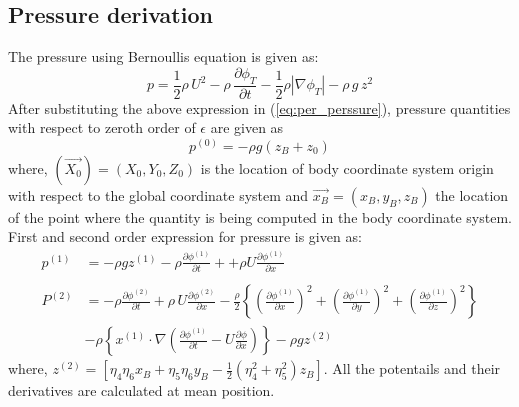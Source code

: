\subsection{Pressure derivation}
The pressure using Bernoullis equation is given as:
\begin{equation}
    \label{eq:pressure}
    p = \frac{1}{2}\rho\,U^2 - \rho\,\frac{\partial \phi_T}{\partial t} - \frac{1}{2}\rho |\nabla\phi_T|-\rho\,g\,z^2
\end{equation} 
After substituting the above expression in (\ref{eq:per_perssure}), pressure quantities with respect 
to zeroth order of $\epsilon$ are given as 
\begin{equation}
    \label{eq:pressure_zero}
    p^{(0)} = - \rho g(z_B + z_0)
\end{equation}
where, $(\vec{X_0}) = (X_0, Y_0, Z_0)$ is the location of body coordinate system origin with respect to the global 
coordinate system and $\vec{x_B}=(x_B, y_B, z_B)$ the location of the point where the quantity is being computed in the body coordinate
system.
First and second order expression for pressure is given as:
\begin{align}
    \label{eq:pressure_first}
    p^{(1)} &= -\rho g z^{(1)} - \rho\frac{\partial \phi^{(1)}}{\partial t} +
    +\rho U\frac{\partial \phi^{(1)}}{\partial x}
    \\ \nonumber \\
    \label{eq:pressure_second}
    P^{(2)} &= -\rho\frac{\partial \phi^{(2)}}{\partial t} + \rho\,U\frac{\partial \phi^{(2)}}{\partial x} -\frac{\rho}{2}
    \left\{\left(\frac{\partial \phi^{(1)}}{\partial x}\right)^2 + \left(\frac{\partial \phi^{(1)}}{\partial y}\right)^2 + 
    \left(\frac{\partial \phi^{(1)}}{\partial z}\right)^2\right\} \\ \nonumber
    &-\rho\left\{x^{(1)}\cdot\nabla \left(\frac{\partial \phi^{(1)}}{\partial t} - U\frac{\partial \phi}{\partial x}\right)\right\}
    - \rho g z^{(2)}
\end{align}
where, $z^{(2)} = [\eta_4\eta_6 x_B + \eta_5\eta_6 y_B - \frac{1}{2}(\eta_4^2 + \eta_5^2)z_B]$. All the potentails and 
their derivatives are calculated at mean position.

